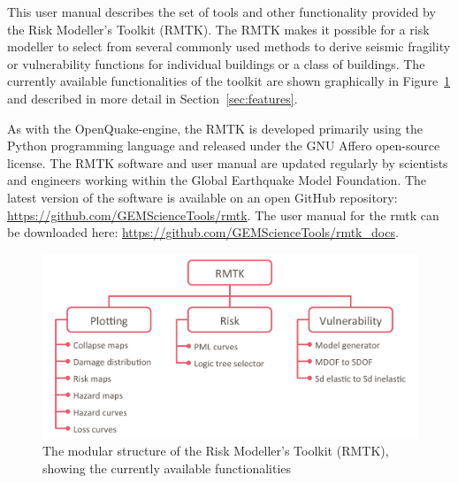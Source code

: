 This user manual describes the set of tools and other functionality provided by the Risk Modeller's Toolkit (RMTK). The RMTK makes it possible for a risk modeller to select from several commonly used methods to derive seismic fragility or vulnerability functions for individual buildings or a class of buildings. The currently available functionalities of the toolkit are shown graphically in Figure~\ref{fig:rmtk-structure} and described in more detail in Section~\ref{sec:features}.

As with the OpenQuake-engine, the RMTK is developed primarily using the Python programming language and released under the GNU Affero open-source license. The RMTK software and user manual are updated regularly by scientists and engineers working within the Global Earthquake Model Foundation. The latest version of the software is available on an open GitHub repository: \href{https://github.com/GEMScienceTools/rmtk}{https://github.com/GEMScienceTools/rmtk}. The user manual for the rmtk can be downloaded here: \href{https://github.com/GEMScienceTools/rmtk_docs}{https://github.com/GEMScienceTools/rmtk\_docs}.

\begin{figure}[!htbp]
	\centering
	\includegraphics[width=\textwidth]{figures/rmtk_structure.png}
	\caption{The modular structure of the Risk Modeller's Toolkit (RMTK), showing the currently available functionalities}
	\label{fig:rmtk-structure}
\end{figure}